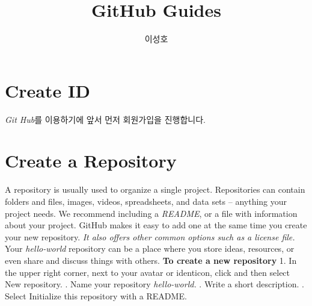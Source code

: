 \documentclass[11pt]{report}
\author{이성호}
\title{GitHub Guides}
\begin{document}
\maketitle
\chapter{Create ID}
\textsl{Git Hub}를 이용하기에 앞서 먼저 회원가입을 진행합니다.
\chapter{Create a Repository}
A repository is usually used to organize a single project. Repositories can contain folders and files, images, videos, spreadsheets, and data sets – anything your project needs. We recommend including a \textsl{README}, or a file with information about your project. GitHub makes it easy to add one at the same time you create your new repository. \textsl{It also offers other common options such as a license file.}
\newline
\newline Your \textsl{hello-world} repository can be a place where you store ideas, resources, or even share and discuss things with others.
\newline
\newline \textbf {\LARGE To create a new repository}
\newline
\newline \small 1. In the upper right corner, next to your avatar or identicon, click  and then select New repository.
\newline
{}. Name your repository \textsl{hello-world.}
\newline
{}. Write a short description.
\newline
{}. Select Initialize this repository with a README.
\end{document}
